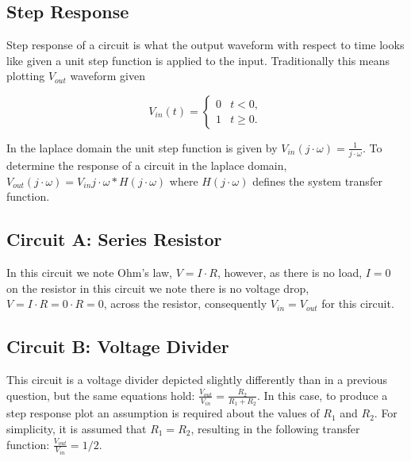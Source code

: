 \documentclass[main.tex]{subfiles}
\begin{document}
\subsection{Step Response}
Step response of a circuit is what the output waveform with respect to time looks like given a unit step function is applied to the input. Traditionally this means plotting $V_{out}$ waveform given 

\[
    V_{in}(t) =
    \begin{cases} 
        0 & t < 0, \\
        1 & t \geq 0.
    \end{cases}
\]

In the laplace domain the unit step function is given by $V_{in}(j \cdot \omega) = \frac{1}{j \cdot \omega}$. To determine the response of a circuit in the laplace domain, $V_{out}(j \cdot \omega) = V_{in}{j \cdot \omega} * H(j \cdot \omega)$ where $H(j \cdot \omega)$ defines the system transfer function.


\subsection{Circuit A: Series Resistor}
In this circuit we note Ohm's law, $V = I \cdot R$, however, as there is no load, $I=0$ on the resistor in this circuit we note there is no voltage drop, $V=I \cdot R=0 \cdot R=0$, across the resistor, consequently $V_{in} = V_{out}$ for this circuit. 


\subsection{Circuit B: Voltage Divider}
This circuit is a voltage divider depicted slightly differently than in a previous question, but the same equations hold: $\frac{V_{out}}{V_{in}} = \frac{R_2}{R_1 + R_2}$. In this case, to produce a step response plot an assumption is required about the values of $R_1$ and $R_2$. For simplicity, it is assumed that $R_1 = R_2$, resulting in the following transfer function: $\frac{V_{out}}{V_{in}} = 1/2$.

\end{document}
